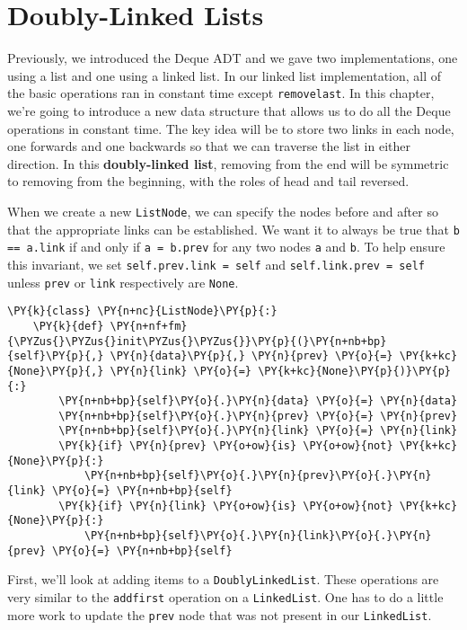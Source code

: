 \chapter{Doubly-Linked Lists}


Previously, we introduced the Deque ADT and we gave two implementations, one using a list and one using a linked list.
In our linked list implementation, all of the basic operations ran in constant time except \texttt{removelast}.
In this chapter, we're going to introduce a new data structure that allows us to do all the Deque operations in constant time.
The key idea will be to store two links in each node, one forwards and one backwards so that we can traverse the list in either direction.
In this \textbf{doubly-linked list}, removing from the end will be symmetric to removing from the beginning, with the roles of head and tail reversed.


When we create a new \texttt{ListNode}, we can specify the nodes before and after so that the appropriate links can be established.
We want it to always be true that \texttt{b == a.link} if and only if \texttt{a = b.prev} for any two nodes \texttt{a} and \texttt{b}.
To help ensure this invariant, we set \texttt{self.prev.link = self} and \texttt{self.link.prev = self} unless \texttt{prev} or \texttt{link} respectively are \texttt{None}.

\begin{Verbatim}[commandchars=\\\{\}]
\PY{k}{class} \PY{n+nc}{ListNode}\PY{p}{:}
    \PY{k}{def} \PY{n+nf+fm}{\PYZus{}\PYZus{}init\PYZus{}\PYZus{}}\PY{p}{(}\PY{n+nb+bp}{self}\PY{p}{,} \PY{n}{data}\PY{p}{,} \PY{n}{prev} \PY{o}{=} \PY{k+kc}{None}\PY{p}{,} \PY{n}{link} \PY{o}{=} \PY{k+kc}{None}\PY{p}{)}\PY{p}{:}
        \PY{n+nb+bp}{self}\PY{o}{.}\PY{n}{data} \PY{o}{=} \PY{n}{data}
        \PY{n+nb+bp}{self}\PY{o}{.}\PY{n}{prev} \PY{o}{=} \PY{n}{prev}
        \PY{n+nb+bp}{self}\PY{o}{.}\PY{n}{link} \PY{o}{=} \PY{n}{link}
        \PY{k}{if} \PY{n}{prev} \PY{o+ow}{is} \PY{o+ow}{not} \PY{k+kc}{None}\PY{p}{:}
            \PY{n+nb+bp}{self}\PY{o}{.}\PY{n}{prev}\PY{o}{.}\PY{n}{link} \PY{o}{=} \PY{n+nb+bp}{self}
        \PY{k}{if} \PY{n}{link} \PY{o+ow}{is} \PY{o+ow}{not} \PY{k+kc}{None}\PY{p}{:}
            \PY{n+nb+bp}{self}\PY{o}{.}\PY{n}{link}\PY{o}{.}\PY{n}{prev} \PY{o}{=} \PY{n+nb+bp}{self}
\end{Verbatim}



First, we'll look at adding items to a \texttt{DoublyLinkedList}.
These operations are very similar to the \texttt{addfirst} operation on a \texttt{LinkedList}.
One has to do a little more work to update the \texttt{prev} node that was not present in our \texttt{LinkedList}.

